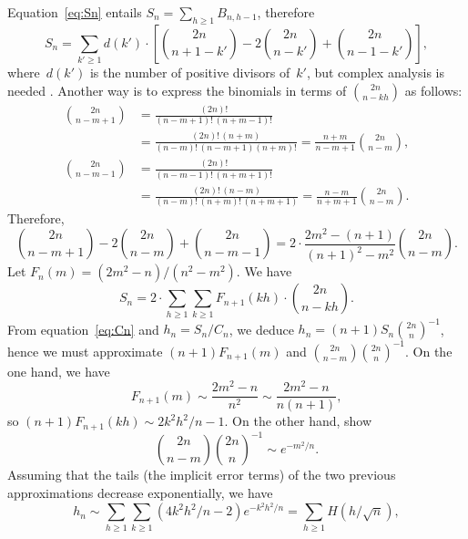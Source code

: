 Equation~\eqref{eq:Sn} entails \(S_{n} = \sum_{h \geqslant 1}
B_{n,h-1}\), therefore
\begin{equation*}
S_{n} = \sum_{k' \geqslant 1}d(k') \cdot
         \left[\binom{2n}{n+1-k'} - 2\binom{2n}{n-k'}
         + \binom{2n}{n-1-k'}\right],
\end{equation*}
where~\(d(k')\) is the number of positive divisors of~\(k'\), but
complex analysis is needed
\citep{KnuthdeBruijnRice_1972,FlajoletGourdonDumas_1995}. Another way
is to express the binomials in terms of \(\binom{2n}{n-kh}\) as
follows:
\begin{align*}
\binom{2n}{n-m+1} &= \frac{(2n)!}{(n-m+1)!\,(n+m-1)!}\\
                  &= \frac{(2n)!\,(n+m)}{(n-m)!\,(n-m+1)(n+m)!}
                   = \frac{n+m}{n-m+1}\binom{2n}{n-m},\\
\binom{2n}{n-m-1} &= \frac{(2n)!}{(n-m-1)!\,(n+m+1)!}\\
                  &= \frac{(2n)!\,(n-m)}{(n-m)!\,(n+m)!\,(n+m+1)}
                   = \frac{n-m}{n+m+1}\binom{2n}{n-m}.
\end{align*}
Therefore,
\begin{equation*}
\binom{2n}{n-m+1} - 2\binom{2n}{n-m} + \binom{2n}{n-m-1}
= 2 \cdot \frac{2m^2-(n+1)}{(n+1)^2-m^2}\binom{2n}{n-m}.
\end{equation*}
Let \(F_n(m) = (2m^2-n)/(n^2-m^2)\). We have
\begin{equation*}
S_{n} = 2 \cdot \sum_{h \geqslant 1}\sum_{k \geqslant 1} F_{n+1}(kh)
\cdot \binom{2n}{n-kh}.
\end{equation*}
From equation~\eqref{eq:Cn} and \(h_n = S_n/C_n\), we deduce \(h_{n} =
(n+1)S_{n}{\binom{2n}{n}}^{-1}\), hence we must approximate
\((n+1)F_{n+1}(m)\) and \(\binom{2n}{n-m}\binom{2n}{n}^{-1}\). On the
one hand, we have
\begin{equation*}
F_{n+1}(m) \sim \frac{2m^2-n}{n^2} \sim \frac{2m^2-n}{n(n+1)},
\end{equation*}
so \((n+1)F_{n+1}(kh) \sim 2k^2h^2\!/n-1\). On the other hand,
\citet*[4.6, 4.8]{SedgewickFlajolet_1996} show
\begin{equation*}
\binom{2n}{n-m}{\binom{2n}{n}}^{-1} \sim e^{-m^2\!/n}.
\end{equation*}
Assuming that the tails (the implicit error terms) of the two previous
approximations decrease exponentially, we have
\begin{equation*}
h_{n} \sim \sum_{h \geqslant 1}\sum_{k \geqslant 1}
(4k^2h^2\!/n - 2)e^{-k^2h^2\!/n}
= \sum_{h \geqslant 1}H(h/\!\sqrt{n}),
\end{equation*}
